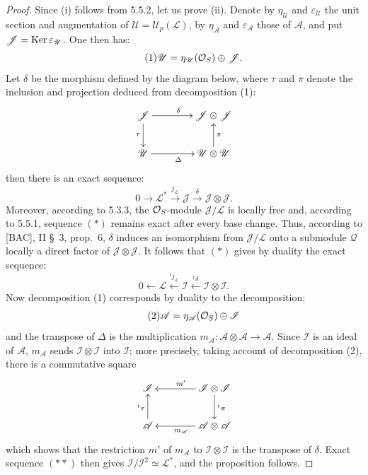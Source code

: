 \begin{proof}
Since (i) follows from 5.5.2, let us prove (ii). Denote by $\eta_{\mathscr U}$ and $\varepsilon_{\mathscr U}$ the unit section and augmentation of $\mathscr U=\mathscr U_p(\mathscr L)$, by $\eta_{\mathscr A}$ and $\varepsilon_{\mathscr A}$ those of $\mathscr A$, and put $\mathscr J=\operatorname{Ker}\varepsilon_{\mathscr U}$. One then has:
\begin{equation}\tag{1}\mathscr U=\eta_{\mathscr U}(\mathcal{O}_S)\oplus\mathscr J.\end{equation}
Let $\delta$ be the morphism defined by the diagram below, where $\tau$ and $\pi$ denote the inclusion and projection deduced from decomposition (1):
\[
\xymatrix@C=4em{\mathscr J\ar[r]^\delta\ar[d]_\tau&\mathscr J\otimes\mathscr J\\
\mathscr U\ar[r]_\Delta&\mathscr U\otimes\mathscr U\ar[u]_\pi}
\]
then there is an exact sequence:
\begin{equation}\tag{$*$}
0\longrightarrow\mathscr L^*\xrightarrow{j_{\mathscr L}}\mathscr J\xrightarrow{\delta}\mathscr J\otimes\mathscr J.
\end{equation}
Moreover, according to 5.3.3, the $\mathcal{O}_S$-module $\mathscr J/\mathscr L$ is locally free and, according to 5.5.1, sequence $(*)$ remains exact after every base change. Thus, according to [BAC], II \S~3, prop.\ 6, $\delta$ induces an isomorphism from $\mathscr J/\mathscr L$ onto a submodule $\mathscr Q$ locally a direct factor of $\mathscr J\otimes\mathscr J$. It follows that $(*)$ gives by duality the exact sequence:
\begin{equation}\tag{$**$}
0\longleftarrow\mathscr L\xleftarrow{{}^tj_{\mathscr L}}\mathscr I\xleftarrow{{}^t\delta}\mathscr I\otimes\mathscr I.
\end{equation}
Now decomposition (1) corresponds by duality to the decomposition:
\begin{equation}\tag{2}\mathscr A=\eta_{\mathscr A}(\mathcal{O}_S)\oplus\mathscr I\end{equation}
and the transpose of $\Delta$ is the multiplication $m_{\mathscr A}:\mathscr A\otimes\mathscr A\to\mathscr A$. Since $\mathscr I$ is an ideal of $\mathscr A$, $m_{\mathscr A}$ sends $\mathscr I\otimes\mathscr I$ into $\mathscr I$; more precisely, taking account of decomposition (2), there is a commutative square
\[
\xymatrix@C=4em{\mathscr I&\mathscr I\otimes\mathscr I\ar[l]_{m'}\ar[d]^{{}^t\pi}\\
\mathscr A\ar[u]^{{}^t\tau}&\mathscr A\otimes\mathscr A\ar[l]^{m_{\mathscr A}}}
\]
which shows that the restriction $m'$ of $m_{\mathscr A}$ to $\mathscr I\otimes\mathscr I$ is the transpose of $\delta$. Exact sequence $(**)$ then gives $\mathscr I/\mathscr I^2\simeq\mathscr L^*$, and the proposition follows.
\end{proof}

